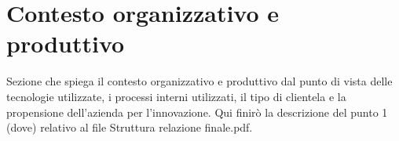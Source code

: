 \section{Contesto organizzativo e produttivo}

Sezione che spiega il contesto organizzativo e produttivo dal punto di vista delle tecnologie utilizzate, i processi interni
utilizzati, il tipo di clientela e la propensione dell’azienda per l’innovazione.
Qui finirò la descrizione del punto 1 (dove) relativo al file Struttura relazione finale.pdf.